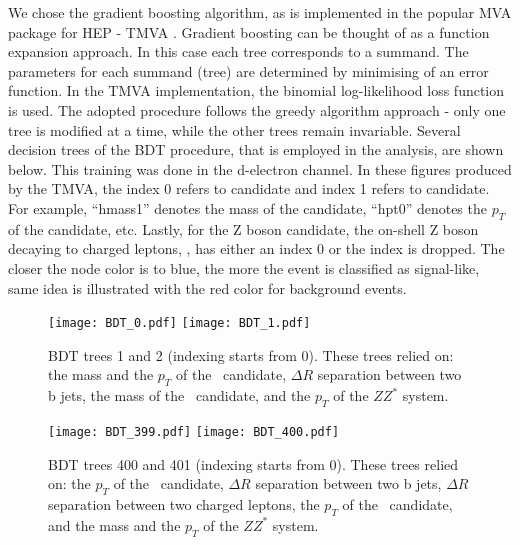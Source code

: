 We chose the gradient boosting algorithm, as is implemented in the popular MVA package for HEP - TMVA \cite{Hocker:2007ht}.  Gradient boosting can be thought of as a function expansion approach. In this case each tree corresponds to a summand. The parameters for each summand (tree) are determined by minimising of an error function. In the TMVA implementation, the binomial log-likelihood loss function is used. The adopted procedure follows the greedy algorithm approach - only one tree is modified at a time, while the other trees remain invariable.
 Several decision trees of the BDT procedure, that is employed in the analysis, are shown below. This training was done in the d-electron channel. In these figures produced by the TMVA, the index 0 refers to \HZZ candidate and index 1 refers to \HBB candidate. For example, ``hmass1'' denotes the mass of the \HZZ candidate, ``hpt0'' denotes the $p_T$ of the \HBB candidate, etc. Lastly, for the Z boson candidate, the on-shell Z boson decaying to charged leptons, \Zll, has either an index 0 or the index is dropped. The closer the node color is to blue, the more the event is classified as signal-like, same idea is illustrated with the red color for background events. 
           
 \begin{figure}[H]
  \begin{center}
    \texttt{[image: BDT\_0.pdf]}
    \texttt{[image: BDT\_1.pdf]}\\
     \caption{BDT trees 1 and 2 (indexing starts from 0). These trees relied on: the mass and the $p_T$ of the \Zll~candidate, $\Delta R$ separation between two b jets,  the mass of the \HBB~candidate, and the $p_T$ of the $ZZ^*$ system.}
    \label{fig:bdt_trees}
  \end{center}
\end{figure}

\begin{figure}[H]
  \begin{center}
    \texttt{[image: BDT\_399.pdf]}
    \texttt{[image: BDT\_400.pdf]}\\
     \caption{BDT trees 400 and 401 (indexing starts from 0). These trees relied on: the $p_T$ of the \Zll~candidate, 
     $\Delta R$ separation between two b jets,
     $\Delta R$ separation between two charged leptons, 
      the $p_T$ of the \HBB~candidate, and the mass and the $p_T$ of the $ZZ^*$ system.}    
      \label{fig:bdt_trees_2}
  \end{center}
\end{figure}

